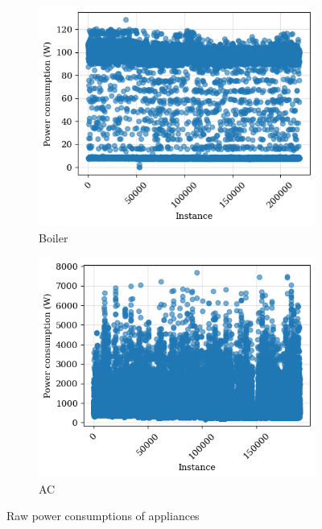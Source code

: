 \begin{figure}
\begin{subfigure}{.5\textwidth}
      \includegraphics[width=.9\linewidth]{images/raw_consumptions/boiler.png}
      \caption{Boiler}
      \label{fig:boiler}
    \end{subfigure}%
    \begin{subfigure}{.5\textwidth}
      \centering
      \includegraphics[width=.9\linewidth]{images/raw_consumptions/ac.png}
      \caption{AC}
      \label{fig:ac}
    \end{subfigure}
\caption{Raw power consumptions of appliances}
\label{fig:raw_power_consumptions}
\end{figure}

